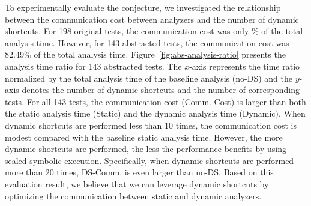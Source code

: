 To experimentally evaluate the conjecture, we investigated the relationship between
the communication cost between analyzers and the number of dynamic shortcuts.
For 198 original tests, the communication cost was only
\% of the total analysis time.  However, for 143
abstracted tests, the communication cost was 82.49\% of the
total analysis time.  Figure~\ref{fig:abs-analysis-ratio} presents the
analysis time ratio for 143 abstracted tests.
The $x$-axis represents the time ratio normalized by the total analysis time of
the baseline analysis (no-DS) and the $y$-axis denotes the number of dynamic
shortcuts and the number of corresponding tests.
For all 143 tests, the communication cost (Comm. Cost) is larger than
both the static analysis time (Static) and the dynamic analysis
time (Dynamic).  When dynamic shortcuts are performed less than 10 times,
the communication cost is modest compared with the baseline static
analysis time.  However, the more dynamic shortcuts are performed,
the less the performance benefits by using sealed symbolic execution.
Specifically, when dynamic shortcuts are performed more than
20 times, DS-Comm. is even larger than no-DS.
Based on this evaluation result, we believe that we can leverage
dynamic shortcuts by optimizing the communication between static and dynamic analyzers.

